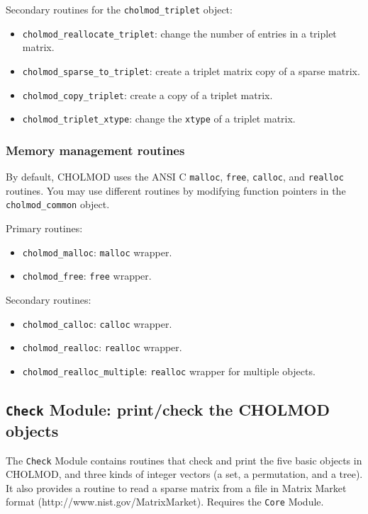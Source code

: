 \documentclass[11pt]{article}
\begin{document}
\noindent Secondary routines for the {\tt cholmod\_triplet} object:
    \begin{itemize}
    \item {\tt cholmod\_reallocate\_triplet}: change the number of entries in a triplet matrix.
    \item {\tt cholmod\_sparse\_to\_triplet}: create a triplet matrix copy of a sparse matrix.
    \item {\tt cholmod\_copy\_triplet}: create a copy of a triplet matrix.
    \item {\tt cholmod\_triplet\_xtype}: change the {\tt xtype} of a triplet matrix.
    \end{itemize}

\subsubsection{Memory management routines}
    By default, CHOLMOD uses the ANSI C {\tt malloc}, {\tt free},
    {\tt calloc}, and {\tt realloc} routines.  You may use different
    routines by modifying function pointers in the {\tt cholmod\_common} object.

\vspace{0.1in}
\noindent Primary routines:
    \begin{itemize}
    \item {\tt cholmod\_malloc}: {\tt malloc} wrapper.
    \item {\tt cholmod\_free}: {\tt free} wrapper.
    \end{itemize}

\noindent Secondary routines:
    \begin{itemize}
    \item {\tt cholmod\_calloc}: {\tt calloc} wrapper.
    \item {\tt cholmod\_realloc}: {\tt realloc} wrapper.
    \item {\tt cholmod\_realloc\_multiple}: {\tt realloc} wrapper for multiple objects.
    \end{itemize}

\newpage \subsection{{\tt Check} Module: print/check the CHOLMOD objects}
    The {\tt Check} Module contains routines that check and print the five
    basic objects in CHOLMOD, and three kinds of integer vectors (a set,
    a permutation, and a tree).  It also provides a routine to read a sparse
    matrix from a file in Matrix Market format (http://www.nist.gov/MatrixMarket).
    Requires the {\tt Core} Module.
\end{document}
